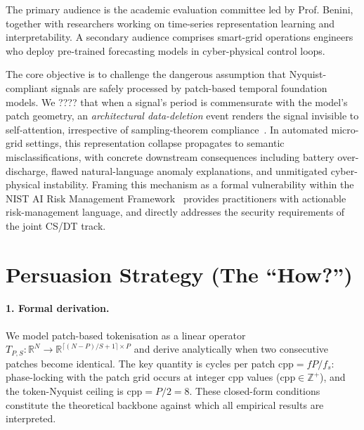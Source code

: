 \documentclass[11pt,a4paper]{article}
\begin{document}
The primary audience is the academic evaluation committee led by Prof. Benini, together with researchers working on time-series representation learning and interpretability. A secondary audience comprises smart-grid operations engineers who deploy pre-trained forecasting models in cyber-physical control loops.

The core objective is to challenge the dangerous assumption that Nyquist-compliant signals are safely processed by patch-based temporal foundation models. We ???? that when a signal's period is commensurate with the model's patch geometry, an \emph{architectural data-deletion} event renders the signal invisible to self-attention, irrespective of sampling-theorem compliance~\cite{oppenheim2010}. In automated micro-grid settings, this representation collapse propagates to semantic misclassifications, with concrete downstream consequences including battery over-discharge, flawed natural-language anomaly explanations, and unmitigated cyber-physical instability. Framing this mechanism as a formal vulnerability within the NIST AI Risk Management Framework~\cite{nist2023} provides practitioners with actionable risk-management language, and directly addresses the security requirements of the joint CS/DT track.

\section{Persuasion Strategy (The ``How?'')}

\paragraph{1. Formal derivation.}
We model patch-based tokenisation as a linear operator $T_{P,S}:\mathbb{R}^N\!\to\mathbb{R}^{\lceil(N-P)/S+1\rceil\times P}$ and derive analytically when two consecutive patches become identical. The key quantity is cycles per patch $\mathrm{cpp}=fP/f_s$: phase-locking with the patch grid occurs at integer cpp values ($\mathrm{cpp}\in\mathbb{Z}^+$), and the token-Nyquist ceiling is $\mathrm{cpp}=P/2=8$. These closed-form conditions constitute the theoretical backbone against which all empirical results are interpreted.
\end{document}
